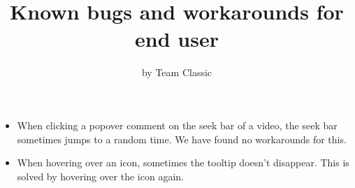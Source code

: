 \documentclass{article}
\title{Known bugs and workarounds for end user}
\author{by Team Classic}
\date{}
\begin{document}
\maketitle

\begin{itemize}
\item When clicking a popover comment on the seek bar of a video, the seek bar sometimes jumps to a random time. We have found no workarounds for this.
\item When hovering over an icon, sometimes the tooltip doesn't disappear. This is solved by hovering over the icon again.
\end{itemize}
\end{document}

